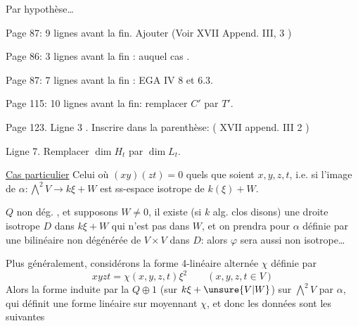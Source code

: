 Par hypothèse\ldots

Page 87: 9 lignes avant la fin. Ajouter (Voir XVII\inserted{,} Append. III, 3 )

Page 86: 3 lignes avant la fin : auquel cas .

Page 87: 7 lignes avant la fin : EGA IV 8 et 6.3.

Page 115: 10 lignes avant la fin: remplacer $C'$ par $T'$.

Page 123. Ligne 3 . Inscrire dans la parenthèse: ( XVII append. III\inserted{,} 2 )

Ligne 7. Remplacer $\dim H_t$ par $\dim L_t$.


\uline{Cas particulier} Celui où $(xy)(zt)=0$ quels que soient $x,y,z,t$, i.e.
\margin{[i.e. $(H^1)\unsure{H^3|(H^1)^3}=0$ dans $H^4$ !]}
si l'image de $\alpha:\bigwedge^2V\longrightarrow k\xi+W$ est   ss-espace isotrope de $k(\xi)+W$.

$Q$ non dég. , et supposons $W\neq0$, il existe (si $k$  alg. clos disons) une droite isotrope $D$ dans $k\xi+W$ qui n'est pas dans $W$, et on prendra pour $\alpha$  définie par une  bilinéaire  non dégénérée  de $V\times V$ dans $D$: alors $\varphi$ sera aussi non isotrope\ldots


Plus généralement, considérons la forme 4-linéaire alternée $\chi$ définie par
\[
xyzt=\chi(x,y,z,t)\xi^2\qquad(x,y,z,t\in V)
\]
Alors la forme  induite par la  $Q\oplus1$ (sur $k\xi+\unsure{V|W}$) sur $\bigwedge^2 V$ par $\alpha$, qui définit une  forme linéaire sur
moyennant $\chi$, et donc les données sont les suivantes

